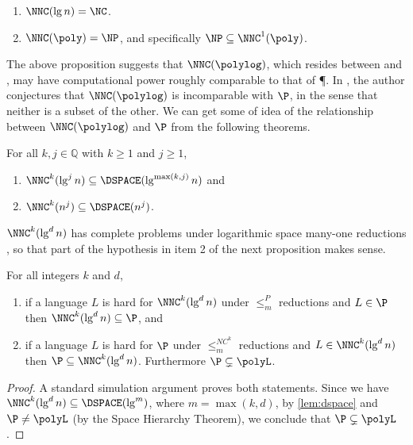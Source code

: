 \documentclass{article}
\begin{document}
\begin{proposition}\label{prop:nnc}
  \mbox{}
  \begin{enumerate}
  \item $\NNC(\lg n) = \NC$.
  \item $\NNC(\poly) = \NP$, and specifically $\NP \subseteq \NNC^1(\poly)$.
  \end{enumerate}
\end{proposition}

The above proposition suggests that $\NNC(\polylog)$, which resides between \NC{} and \NP, may have computational power roughly comparable to that of \P.
In \cite{wolf94}, the author conjectures that $\NNC(\polylog)$ is incomparable with $\P$, in the sense that neither is a subset of the other.
We can get some of idea of the relationship between $\NNC(\polylog)$ and $\P$ from the following theorems.

\begin{lemma}\label{lem:dspace}
  For all $k, j \in \mathbb{Q}$ with $k \geq 1$ and $j \geq 1$,
  \begin{enumerate}
  \item $\NNC^k(\lg^j n) \subseteq \DSPACE(\lg^{\max(k, j)} n)$ and
  \item $\NNC^k(n^j) \subseteq \DSPACE(n^j)$.
  \end{enumerate}
\end{lemma}

$\NNC^k(\lg^d n)$ has complete problems under logarithmic space many-one reductions \cite[Theorem~3.6]{cc97}, so that part of the hypothesis in item 2 of the next proposition makes sense.

\begin{proposition}
  For all integers $k$ and $d$,
  \begin{enumerate}
  \item if a language $L$ is hard for $\NNC^k(\lg^d n)$ under $\leq_m^P$ reductions and $L \in \P$ then $\NNC^k(\lg^d n) \subseteq \P$, and
  \item if a language $L$ is hard for $\P$ under $\leq_m^{NC^k}$ reductions and $L \in \NNC^k(\lg^d n)$ then $\P \subseteq \NNC^k(\lg^d n)$.
    Furthermore $\P \subsetneq \polyL$.
  \end{enumerate}
\end{proposition}
\begin{proof}
  A standard simulation argument proves both statements.
  Since we have $\NNC^k(\lg^d n) \subseteq \DSPACE(\lg^m)$, where $m = \max(k, d)$, by \autoref{lem:dspace} and $\P \neq \polyL$ (by the Space Hierarchy Theorem), we conclude that $\P \subsetneq \polyL$.
\end{proof}
\end{document}
